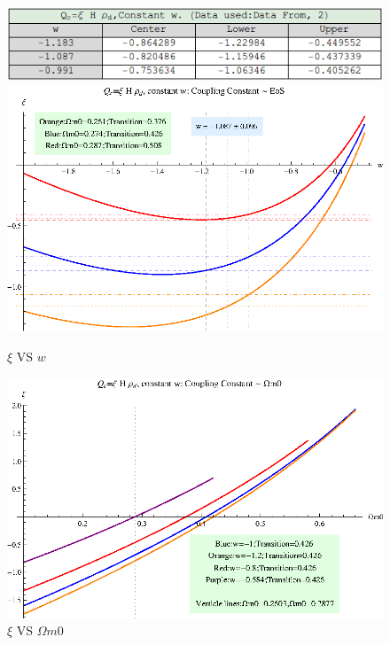 \documentclass[12pt,a4paper]{article}
\begin{document}
\begin{figure}
\centering
\includegraphics[width=450pt]{rhod_I2CC_table1.png}
\includegraphics[width=500pt]{rhod_I2CC_xiVSw2.eps}
\caption{$\xi$ VS $w$}\label{fig-rhod_I2CC_xiVSw2}
\end{figure}




\begin{figure}
\centering
\includegraphics[width=500pt]{rhod_I2CC_xiVSOmegam02.eps}
\caption{$\xi$ VS $\Omega m0$}\label{fig-rhod_I2CC_xiVSOmegam02}
\end{figure}
\end{document}
